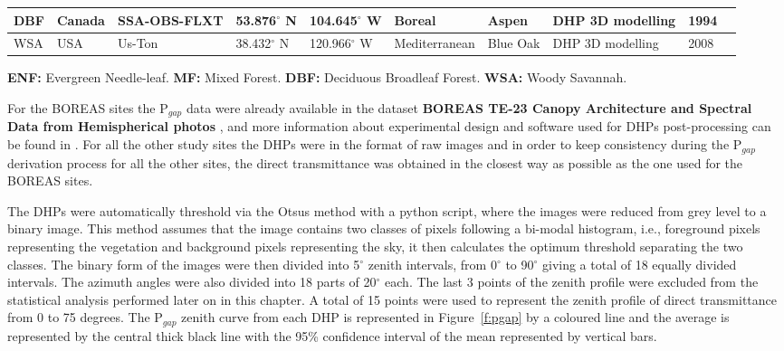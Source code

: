 \documentclass[a4paper,11pt]{report}
\begin{document}
\begin{sidewaystable}
\begin{tabular}{p{1.0cm} p{1.5cm} p{2.1cm} p{2.1cm} p{2.1cm} p{2.1cm} p{2.1cm} p{2.5cm} p{1.0cm} p{2.1cm}}
\hline
\multirow{1}{*}{DBF} 
     &  Canada & SSA-OBS-FLXT &   53.876$^{\circ}$ N & 104.645$^{\circ}$ W & Boreal & Aspen & DHP \newline 3D modelling & 1994 & \citet{chen1997}\\
\hline
\multirow{1}{*}{WSA} 
     &  USA & Us-Ton &  38.432$^{\circ}$ N & 120.966$^{\circ}$ W & Mediterranean & Blue Oak & DHP \newline 3D modelling & 2008 &\citet{ryu2012}\\
\hline
\hline
 \end{tabular}
\label{tab:sites}
\begin{tablenotes}
      \small
      \item \textbf{ENF:} Evergreen Needle-leaf. \textbf{MF:} Mixed Forest. \textbf{DBF:} Deciduous Broadleaf Forest. \textbf{WSA:} Woody Savannah.
\end{tablenotes}
\end{sidewaystable}
\newpage

For the BOREAS sites the P$_{gap}$ data were already available in the dataset \textbf{BOREAS TE-23 Canopy Architecture and Spectral Data from Hemispherical photos} \citep{Rich1999a}, and more information about experimental design and software used for DHPs post-processing can be found in \citet{chen1997}. For all the other study sites the DHPs were in the format of raw images and in order to keep consistency during the P$_{gap}$ derivation process for all the other sites, the direct transmittance was obtained in the closest way as possible as the one used for the BOREAS sites. 

The DHPs were automatically threshold via the Otsu\textquotesingle s method \citep{Otsu1979} with a python script, where the images were reduced from grey level to a binary image. This method assumes that the image contains two classes of pixels following a bi-modal histogram, i.e., foreground pixels representing the vegetation and background pixels representing the sky, it then calculates the optimum threshold separating the two classes. The binary form of the images were then divided into 5$^{\circ}$ zenith intervals, from 0$^{\circ}$ to 90$^{\circ}$ giving a total of 18 equally divided intervals. The azimuth angles were also divided into 18 parts of 20$^{\circ}$ each. The last 3 points of the zenith profile were excluded from the statistical analysis performed later on in this chapter. A total of 15 points were used to represent the zenith profile of direct transmittance from 0 to 75 degrees. The P$_{gap}$ zenith curve from each DHP is represented in Figure~\ref{f:pgap} by a coloured line and the average is represented by the central thick black line with the 95\% confidence interval of the mean represented by vertical bars.
\end{document}
